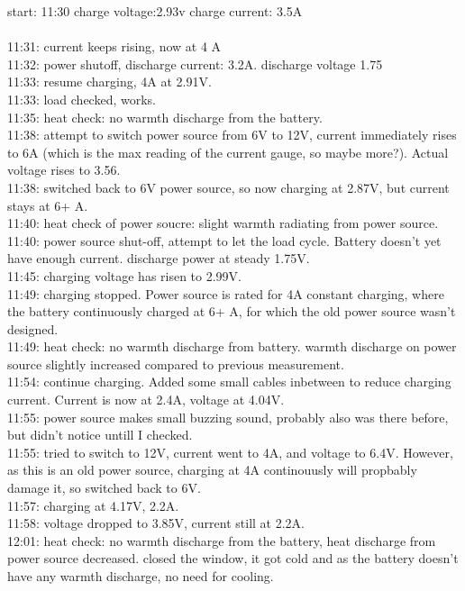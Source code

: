 start: 11:30
charge voltage:2.93v
charge current: 3.5A
\\\\
11:31: current keeps rising, now at 4 A\\
11:32: power shutoff, discharge current: 3.2A. discharge voltage 1.75\\
11:33: resume charging, 4A at 2.91V.\\
11:33: load checked, works.\\
11:35: heat check: no warmth discharge from the battery.\\
11:38: attempt to switch power source from 6V to 12V, current immediately rises to 6A (which is the max reading of the current gauge, so maybe more?). Actual voltage rises to 3.56.\\
11:38: switched back to 6V power source, so now charging at 2.87V, but current stays at 6+ A.\\
11:40: heat check of power soucre: slight warmth radiating from power source.\\
11:40: power source shut-off, attempt to let the load cycle. Battery doesn't yet have enough current. discharge power at steady 1.75V.\\
11:45: charging voltage has risen to 2.99V.\\
11:49: charging stopped. Power source is rated for 4A constant charging, where the battery continuously charged at 6+ A, for which the old power source wasn't designed.\\
11:49: heat check: no warmth discharge from battery. warmth discharge on power source slightly increased compared to previous measurement.\\
11:54: continue charging. Added some small cables inbetween to reduce charging current. Current is now at 2.4A, voltage at 4.04V.\\
11:55: power source makes small buzzing sound, probably also was there before, but didn't notice untill I checked.\\
11:55: tried to switch to 12V, current went to 4A, and voltage to 6.4V. However, as this is an old power source, charging at 4A continouusly will propbably damage it, so switched back to 6V.\\
11:57: charging at 4.17V, 2.2A.\\
11:58: voltage dropped to 3.85V, current still at 2.2A.\\
12:01: heat check: no warmth discharge from the battery, heat discharge from power source decreased. closed the window, it got cold and as the battery doesn't have any warmth discharge, no need for cooling.\\
